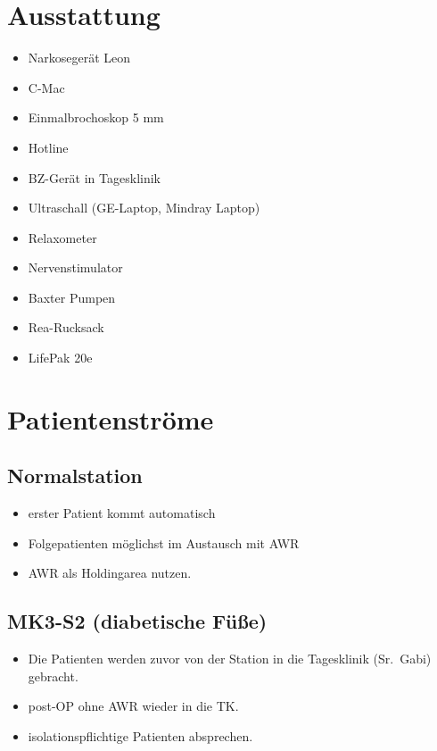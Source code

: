\documentclass[
]{book}
\providecommand{\tightlist}{%
  \setlength{\itemsep}{0pt}\setlength{\parskip}{0pt}}
\begin{document}
\hypertarget{ausstattung}{%
\section{Ausstattung}\label{ausstattung}}

\begin{itemize}
\tightlist
\item
  Narkosegerät Leon
\item
  C-Mac
\item
  Einmalbrochoskop 5 mm
\item
  Hotline
\item
  BZ-Gerät in Tagesklinik
\item
  Ultraschall (GE-Laptop, Mindray Laptop)
\item
  Relaxometer
\item
  Nervenstimulator
\item
  Baxter Pumpen
\item
  Rea-Rucksack
\item
  LifePak 20e
\end{itemize}

\hypertarget{patientenstruxf6me}{%
\section{Patientenströme}\label{patientenstruxf6me}}

\hypertarget{normalstation}{%
\subsection{Normalstation}\label{normalstation}}

\begin{itemize}
\tightlist
\item
  erster Patient kommt automatisch
\item
  Folgepatienten möglichst im Austausch mit AWR
\item
  AWR als Holdingarea nutzen.
\end{itemize}

\hypertarget{mk3-s2-diabetische-fuxfcuxdfe}{%
\subsection{MK3-S2 (diabetische Füße)}\label{mk3-s2-diabetische-fuxfcuxdfe}}

\begin{itemize}
\tightlist
\item
  Die Patienten werden zuvor von der Station in die Tagesklinik (Sr.~Gabi) gebracht.
\item
  post-OP ohne AWR wieder in die TK.
\item
  isolationspflichtige Patienten absprechen.
\end{itemize}
\end{document}
